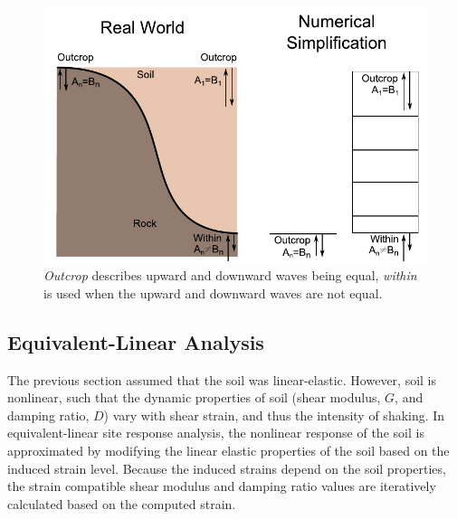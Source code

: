\documentclass[12pt,oneside]{book}
\begin{document}
\begin{figure}[tb]
    \begin{center}
        \includegraphics[width=0.7\linewidth]{figures/siteResponse/withinOutcrop.pdf}
    \end{center}
    \caption{\emph{Outcrop} describes upward and downward waves being equal, \emph{within} is used
    when the upward and downward waves are not equal.}
    \label{fig:siteResponse:outcropWithin}
\end{figure}
\clearpage

\subsection{Equivalent-Linear Analysis}\label{ch:sra:equivLinear}
The previous section assumed that the soil was linear-elastic. However, soil is nonlinear, such that
the dynamic properties of soil (shear modulus, $G$, and damping ratio, $D$) vary with shear strain, and
thus the intensity of shaking.  In equivalent-linear site response analysis, the nonlinear response
of the soil is approximated by modifying the linear elastic properties of the soil based on the
induced strain level.  Because the induced strains depend on the soil properties, the strain
compatible shear modulus and damping ratio values are iteratively calculated based on the computed
strain.  
\end{document}
